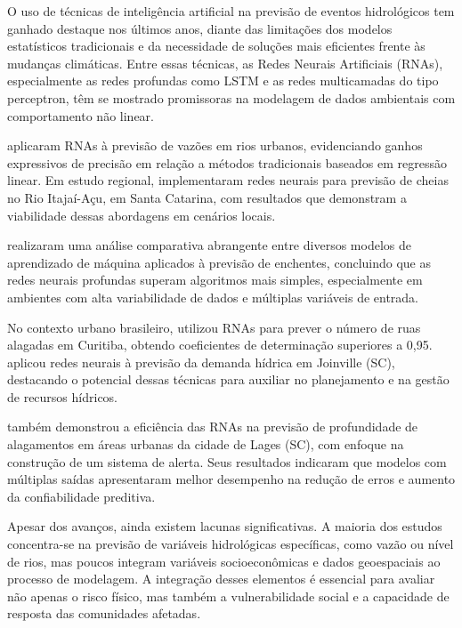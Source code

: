
O uso de técnicas de inteligência artificial na previsão de eventos hidrológicos tem ganhado destaque nos últimos anos, diante das limitações dos modelos estatísticos tradicionais e da necessidade de soluções mais eficientes frente às mudanças climáticas. Entre essas técnicas, as Redes Neurais Artificiais (RNAs), especialmente as redes profundas como LSTM e as redes multicamadas do tipo perceptron, têm se mostrado promissoras na modelagem de dados ambientais com comportamento não linear.

 aplicaram RNAs à previsão de vazões em rios urbanos, evidenciando ganhos expressivos de precisão em relação a métodos tradicionais baseados em regressão linear. Em estudo regional,  implementaram redes neurais para previsão de cheias no Rio Itajaí-Açu, em Santa Catarina, com resultados que demonstram a viabilidade dessas abordagens em cenários locais.

 realizaram uma análise comparativa abrangente entre diversos modelos de aprendizado de máquina aplicados à previsão de enchentes, concluindo que as redes neurais profundas superam algoritmos mais simples, especialmente em ambientes com alta variabilidade de dados e múltiplas variáveis de entrada.

No contexto urbano brasileiro,  utilizou RNAs para prever o número de ruas alagadas em Curitiba, obtendo coeficientes de determinação superiores a 0,95.  aplicou redes neurais à previsão da demanda hídrica em Joinville (SC), destacando o potencial dessas técnicas para auxiliar no planejamento e na gestão de recursos hídricos.

 também demonstrou a eficiência das RNAs na previsão de profundidade de alagamentos em áreas urbanas da cidade de Lages (SC), com enfoque na construção de um sistema de alerta. Seus resultados indicaram que modelos com múltiplas saídas apresentaram melhor desempenho na redução de erros e aumento da confiabilidade preditiva.

Apesar dos avanços, ainda existem lacunas significativas. A maioria dos estudos concentra-se na previsão de variáveis hidrológicas específicas, como vazão ou nível de rios, mas poucos integram variáveis socioeconômicas e dados geoespaciais ao processo de modelagem. A integração desses elementos é essencial para avaliar não apenas o risco físico, mas também a vulnerabilidade social e a capacidade de resposta das comunidades afetadas.

